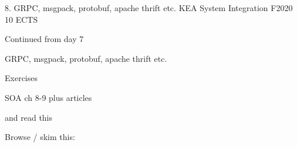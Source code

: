 \documentclass[Screen16to9,17pt]{foils}
\begin{document}
\mytitlepage
{8. GRPC, msgpack, protobuf, apache thrift etc.}
{KEA System Integration F2020 10 ECTS}


\begin{list2}
\item Continued from day 7
\item GRPC, msgpack, protobuf, apache thrift etc.
\item
\end{list2}

Exercises
\begin{list2}
\item
\item
\end{list2}




\begin{list1}
\item SOA ch 8-9 plus articles

and read this\\

\item Browse / skim this:\\

\end{list1}




\slidenext
\end{document}
